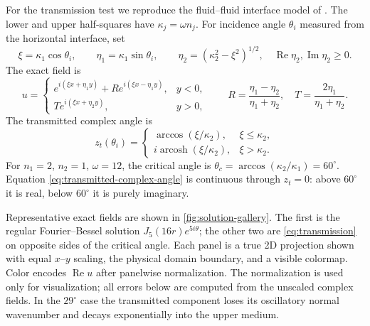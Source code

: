 \documentclass[11pt]{article}
\newcommand{\ii}{i}
\renewcommand{\Re}{\operatorname{Re}}
\renewcommand{\Im}{\operatorname{Im}}
\numberwithin{equation}{section}
\begin{document}
For the transmission test we reproduce the fluid--fluid interface model of \citet{MascottoPichler2020}.  The lower and upper half-squares have $\kappa_j=\omega n_j$.  For incidence angle $\theta_i$ measured from the horizontal interface, set
\[
 \xi=\kappa_1\cos\theta_i,
 \qquad \eta_1=\kappa_1\sin\theta_i,
 \qquad \eta_2=(\kappa_2^2-\xi^2)^{1/2},
 \quad \Re\eta_2,\Im\eta_2\ge0.
\]
The exact field is
\begin{equation}\label{eq:transmission}
 u=\begin{cases}
 e^{\ii(\xi x+\eta_1y)}+R e^{\ii(\xi x-\eta_1y)},&y<0,\\
 T e^{\ii(\xi x+\eta_2y)},&y>0,
 \end{cases}
 \qquad
 R=\dfrac{\eta_1-\eta_2}{\eta_1+\eta_2},\quad
 T=\dfrac{2\eta_1}{\eta_1+\eta_2}.
\end{equation}
The transmitted complex angle is
\begin{equation}\label{eq:transmitted-complex-angle}
 z_t(\theta_i)=
 \begin{cases}
 \arccos(\xi/\kappa_2),&\xi\le\kappa_2,\\
 \ii\operatorname{arcosh}(\xi/\kappa_2),&\xi>\kappa_2.
 \end{cases}
\end{equation}
For $n_1=2$, $n_2=1$, $\omega=12$, the critical angle is $\theta_c=\arccos(\kappa_2/\kappa_1)=60^\circ$.  Equation \eqref{eq:transmitted-complex-angle} is continuous through $z_t=0$: above $60^\circ$ it is real, below $60^\circ$ it is purely imaginary.

Representative exact fields are shown in \cref{fig:solution-gallery}.  The first is the regular Fourier--Bessel solution $J_5(16r)e^{5\ii\theta}$; the other two are \eqref{eq:transmission} on opposite sides of the critical angle.  Each panel is a true 2D projection shown with equal $x$--$y$ scaling, the physical domain boundary, and a visible colormap.  Color encodes $\Re u$ after panelwise normalization.  The normalization is used only for visualization; all errors below are computed from the unscaled complex fields.  In the $29^\circ$ case the transmitted component loses its oscillatory normal wavenumber and decays exponentially into the upper medium.
\end{document}
